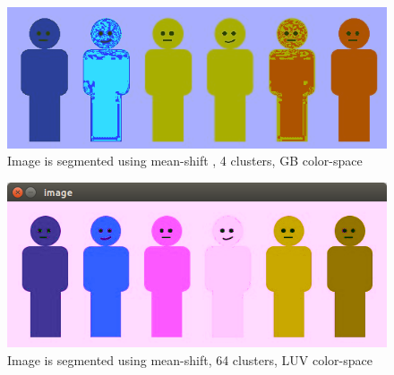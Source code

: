 \documentclass[letterpaper, 12 pt, conference ,onecolumn]{ieeeconf}  %
\begin{document}
\begin{figure}[h!]
\includegraphics[width=0.4\paperwidth]{mean-shift/mean-shift-rgb-4}
\centering
\caption{Image is segmented using mean-shift , 4 clusters, GB color-space }
\label{fig:mean-shift-4}
\end{figure}

\begin{figure}[H]
\includegraphics[width=0.4\paperwidth]{mean-shift/window32-64cluster}
\centering
\caption{Image is segmented using mean-shift, 64 clusters, LUV color-space }
\label{fig:mean-shift-64}
\end{figure}
\end{document}
